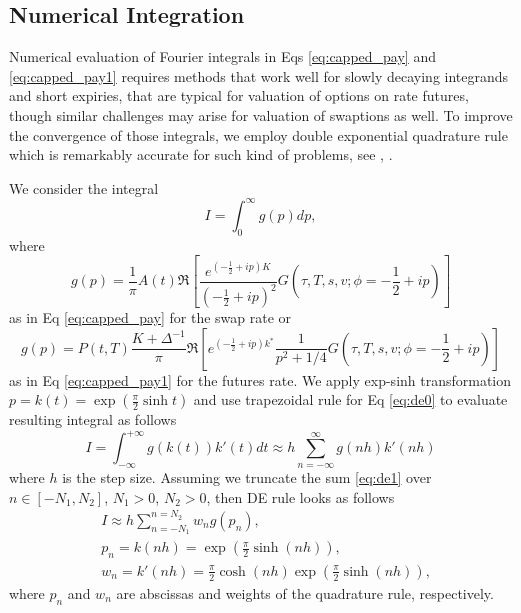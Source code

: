 \documentclass[pdftex,11pt,a4paper] {article}
\begin{document}
\subsection{Numerical Integration}

Numerical evaluation of Fourier integrals in Eqs \eqref{eq:capped_pay} and \eqref{eq:capped_pay1} requires methods that work well for slowly decaying integrands and short expiries, that are typical for valuation of options on rate futures, though similar challenges may arise for valuation of swaptions as well.  
To improve the convergence of those integrals, we employ double exponential quadrature rule which is remarkably accurate for such kind of problems, see \cite{Andersen2018}, \cite{Michalski2016}. 

We consider the integral
\begin{equation}\label{eq:de0}
I=\int_0^\infty g(p)dp,
\end{equation}
where 
\begin{equation*}
g(p)=\frac{1}{\pi} A(t)\Re\left[\frac{e^{\left(-\frac{1}{2}+ip\right) K}}{\left(-\frac{1}{2}+ip\right)^2}G(\tau,T, s, v;\phi=-\frac{1}{2}+ip)\right]
\end{equation*}
as in Eq \eqref{eq:capped_pay} for the swap rate or 
\begin{equation*}
g(p)=P(t,T)\frac{K+\Delta^{-1}}{\pi} \Re\left[ e^{(-\frac{1}{2}+ip) k^{*}}  \frac{1}{p^{2}+1/4} G(\tau,T, s,v ; \phi=-\frac{1}{2}+ip)\right]
\end{equation*}
as in Eq \eqref{eq:capped_pay1} for the futures rate.
We apply exp-sinh transformation $p=k(t)=\exp\left(\frac{\pi}{2}\sinh t\right)$ and use  trapezoidal rule for Eq \eqref{eq:de0} to evaluate resulting integral as follows
\begin{equation}\label{eq:de1}
I=\int_{-\infty}^{+\infty} g(k(t))k'(t)dt\approx h\sum_{n=-\infty}^{\infty}g(nh)k'(nh)
\end{equation}
where $h$ is the step size. Assuming we truncate the sum \eqref{eq:de1} over $n\in[-N_1,N_2]$, $N_1>0$, $N_2>0$, then DE rule looks as follows
\begin{equation}\label{eq:de3}
\begin{split}
&I\approx h\sum_{n=-N_1}^{n=N_2}w_ng(p_n),\\
&p_n=k(nh)=\exp\left(\frac{\pi}{2}\sinh(nh)\right), \\
&w_n=k'(nh)=\frac{\pi}{2}\cosh(nh)\exp\left(\frac{\pi}{2}\sinh(nh)\right),
\end{split}
\end{equation}
where $p_n$ and $w_n$ are abscissas and weights of the quadrature rule, respectively.
\end{document}
